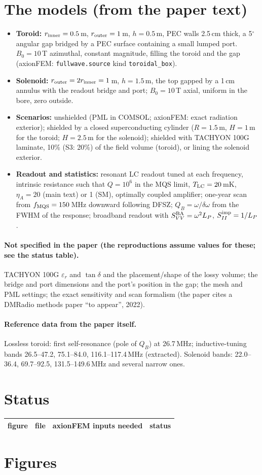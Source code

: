 \documentclass[11pt]{article}
\begin{document}
\section{The models (from the paper text)}
\begin{itemize}
\item \textbf{Toroid:} $r_{\rm inner}=0.5$\,m, $r_{\rm outer}=1$\,m, $h=0.5$\,m, PEC walls 2.5\,cm thick, a
5$^\circ$ angular gap bridged by a PEC surface containing a small lumped port. $B_0=10$\,T azimuthal, constant
magnitude, filling the toroid and the gap (axionFEM: \texttt{fullwave.source} kind \texttt{toroidal\_box}).
\item \textbf{Solenoid:} $r_{\rm outer}=2r_{\rm inner}=1$\,m, $h=1.5$\,m, the top gapped by a 1\,cm annulus with the
readout bridge and port; $B_0=10$\,T axial, uniform in the bore, zero outside.
\item \textbf{Scenarios:} unshielded (PML in COMSOL; axionFEM: exact radiation exterior); shielded by a closed
superconducting cylinder ($R=1.5$\,m, $H=1$\,m for the toroid; $H=2.5$\,m for the solenoid); shielded with
TACHYON 100G laminate, 10\% (S3: 20\%) of the field volume (toroid), or lining the solenoid exterior.
\item \textbf{Readout and statistics:} resonant LC readout tuned at each frequency, intrinsic resistance such that
$Q=10^6$ in the MQS limit, $T_{\rm LC}=20$\,mK, $\eta_A = 20$ (main text) or 1 (SM), optimally coupled amplifier;
one-year scan from $f_{\rm MQS}=150$\,MHz downward following DFSZ; $Q_B=\omega/\delta\omega$ from the FWHM of the
response; broadband readout with $S_{VV}^{\rm BA}=\omega^2L_P$, $S_{II}^{\rm imp}=1/L_P$.
\end{itemize}

\paragraph{Not specified in the paper (the reproductions assume values for these; see the status table).}
TACHYON 100G $\varepsilon_r$ and $\tan\delta$ and the placement/shape of the lossy volume; the bridge and port
dimensions and the port's position in the gap; the mesh and PML settings; the exact sensitivity and scan formalism
(the paper cites a DMRadio methods paper ``to appear'', 2022).

\paragraph{Reference data from the paper itself.} Lossless toroid: first self-resonance (pole of $Q_B$) at
26.7\,MHz; inductive-tuning bands 26.5--47.2, 75.1--84.0, 116.1--117.4\,MHz (extracted). Solenoid bands:
22.0--36.4, 69.7--92.5, 131.5--149.6\,MHz and several narrow ones.

\section{Status}
\begin{longtable}{p{2.2cm}p{4.6cm}p{6.6cm}p{2cm}}
\toprule figure & file & axionFEM inputs needed & status\\\midrule
\bottomrule\end{longtable}

\clearpage

\section{Figures}
\end{document}
